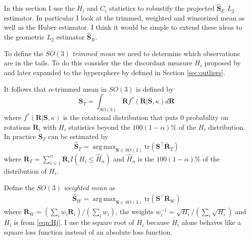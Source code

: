 \documentclass{article}\usepackage{graphicx, color}
\DeclareMathOperator*{\argmax}{arg\,max}
\newcommand{\ProjMean}{{\widehat{\bm S}_{E}}}
\newcommand{\GeomMean}{{\widehat{\bm S}_{R}}}
\newcommand{\WeightMean}{{\widehat{\bm S}_W}}
\newcommand{\TrimMean}{{\widehat{\bm S}_T}}
\begin{document}
In this section I use the $H_i$ and $C_i$ statistics to robustify the projected $\ProjMean$ $L_2$ estimator.  In particular I look at the trimmed, weighted and winsorized mean as well as the Huber estimator.  I think it would be simple to extend these ideas to the geometric $L_2$ estimator $\GeomMean$.

To define the $SO(3)$ \emph{trimmed mean} we need to determine which observations are in the tails.  To do this consider the the discordant measure $H_i$ proposed by \cite{best1986} and later expanded to the hypersphere by \cite{figueiredo2005} defined in Section \ref{sec:outliers}.

It follows that $\alpha$-trimmed mean in $SO(3)$ is defined by
\[
\bm S_{T}=\int_{SO(3)}\bm Rf^*(\bm R|\bm S,\kappa)d\bm R
\]
where $f^*(\bm R|\bm S,\kappa)$ is the rotational distribution that puts $0$ probability on rotations $\bm R_i$ with $H_i$ statistics beyond the $100(1-\alpha)\%$ of the $H_i$ distribution.  In practice $\bm S_T$ can be estimated by
\[
\TrimMean=\argmax_{\bm S\in SO(3)}\text{tr}(\bm S^\top\overline{\bm R}_T)
\]
where $\overline{\bm R}_T=\sum_{i=1}^n\bm R_iI( H_i\leq \hat H_\alpha)$ and $\hat H_{\alpha}$ is the $100(1-\alpha)\%$ of the distribution of $H_i$.


Define the $SO(3)$ \emph{weighted mean} as
\begin{align*}
\WeightMean=\argmax_{\bm S\in SO(3)}\text{tr}(\bm S^\top\overline{\bm R}_W)
\end{align*}
where $\overline{\bm R}_W=(\sum_{i}w_i\bm R_i)/(\sum_i w_i)$, the weights $w_i^{-1}=\sqrt{H_i}/(\sum_i \sqrt{H_i})$ and $H_i$ is from \eqref{eqn:Hj}.  I use the square root of $H_i$ because $H_i$ alone behaves like a square loss function instead of an absolute loss function.
\end{document}
